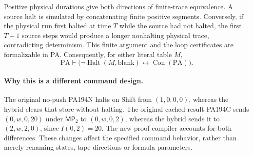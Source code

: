 Positive physical durations give both directions of finite-trace
equivalence.  A source halt is simulated by concatenating finite positive
segments.  Conversely, if the physical run first halted at time $T$ while
the source had not halted, the first $T+1$ source steps would produce a
longer nonhalting physical trace, contradicting determinism.  This finite
argument and the loop certificates are formalizable in PA.  Consequently,
for either literal table $M$,
\[
 \mathrm{PA}\vdash
 \bigl(\neg\operatorname{Halt}(M,\mathrm{blank})
             \longleftrightarrow\operatorname{Con}(\mathrm{PA})\bigr).
\]

\paragraph{Why this is a different command design.}
The original no-push PA194N halts on Shift from $(1,0,0,0)$, whereas the
hybrid clears that store without halting.  The original cached-result
PA194C sends $(0,w,0,20)$ under $\mathsf{MP}_2$ to $(0,w,0,2)$, whereas
the hybrid sends it to $(2,w,2,0)$, since $I(0,2)=20$.  The new proof
compiler accounts for both differences.  These changes affect the specified
command behavior, rather than merely renaming states, tape directions or
formula parameters.
